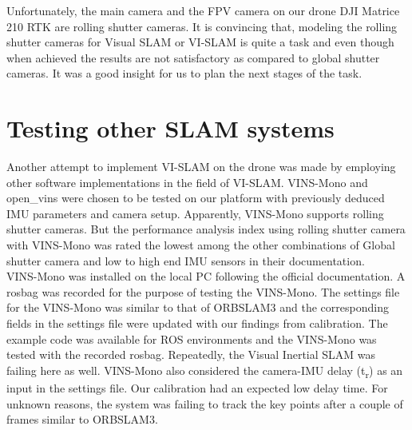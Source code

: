 Unfortunately, the main camera and the FPV camera on our drone DJI Matrice 210 RTK are rolling shutter cameras. It is convincing that, modeling the rolling shutter cameras for Visual SLAM or VI-SLAM is quite a task and even though when achieved the results are not satisfactory as compared to global shutter cameras. It was a good insight for us to plan the next stages of the task.

\newpage

\section{Testing other SLAM systems}
\label{sec:otherslamsystems}
Another attempt to implement VI-SLAM on the drone was made by employing other software implementations in the field of VI-SLAM. VINS-Mono \cite{qin2017vins} and open\_vins \cite{Geneva2020ICRA} were chosen to be tested on our platform with previously deduced IMU parameters and camera setup. Apparently, VINS-Mono supports rolling shutter cameras. But the performance analysis index using rolling shutter camera with VINS-Mono was rated the lowest among the other combinations of Global shutter camera and low to high end IMU sensors in their documentation.\\

VINS-Mono was installed on the local PC following the official documentation. A rosbag was recorded for the purpose of testing the VINS-Mono. The settings file for the VINS-Mono was similar to that of ORBSLAM3 and the corresponding fields in the settings file were updated with our findings from calibration. The example code was available for ROS environments and the VINS-Mono was tested with the recorded rosbag. Repeatedly, the Visual Inertial SLAM was failing here as well. VINS-Mono also considered the camera-IMU delay (t\textsubscript{r}) as an input in the settings file. Our calibration had an expected low delay time. For unknown reasons, the system was failing to track the key points after a couple of frames similar to ORBSLAM3.\\


